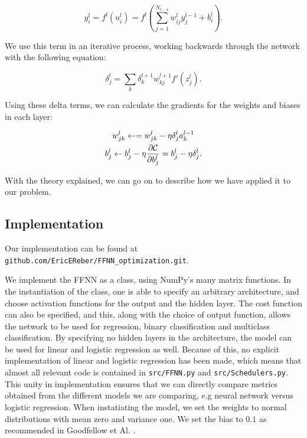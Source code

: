 \documentclass[onecolumn,10pt,cleanfoot]{asme2ej}
\begin{document}
\begin{equation}
y_i^l = f^l(u_i^l) = f^l\left(\sum_{j=1}^{N_{l-1}} w_{ij}^l y_j^{l-1} + b_i^l\right).
\end{equation}

We use this term in an iterative process, working backwards through the network with the following equation:

\begin{equation}
\delta_j^l = \sum_k \delta_k^{l+1}w_{kj}^{l+1}f'(z_j^l).
\end{equation}

Using these delta terms, we can calculate the gradients for the weights and biases in each layer:

\begin{gather}
w_{jk}^l\leftarrow  = w_{jk}^l- \eta \delta_j^la_k^{l-1} \\
b_j^l \leftarrow b_j^l-\eta \frac{\partial {\cal C}}{\partial b_j^l}=b_j^l-\eta \delta_j^l.
\end{gather}

With the theory explained, we can go on to describe how we have applied it to our problem.

\subsection{Implementation}

Our implementation can be found at \texttt{github.com/EricEReber/FFNN\_optimization.git}.

We implement the FFNN as a class, using NumPy's many matrix functions. In the instantiation of the class, one is able to specify an arbitrary architecture, and choose activation functions for the output and the hidden layer. The cost function can also be specified, and this, along with the choice of output function, allows the network to be used for regression, binary classification and multiclass classification. By specifying no hidden layers in the architecture, the model can be used for linear and logistic regression as well. Because of this, no explicit implementation of linear and logistic regression has been made, which means that almost all relevant code is contained in \texttt{src/FFNN.py} and \texttt{src/Schedulers.py}. This unity in implementation ensures that we can directly compare metrics obtained from the different models we are comparing, e.g neural network versus logistic regression. When instatiating the model, we set the weights to normal distributions with mean zero and variance one. We set the bias to $0.1$ as recommended in Goodfellow et Al. \cite[189]{gbc}.
\end{document}
